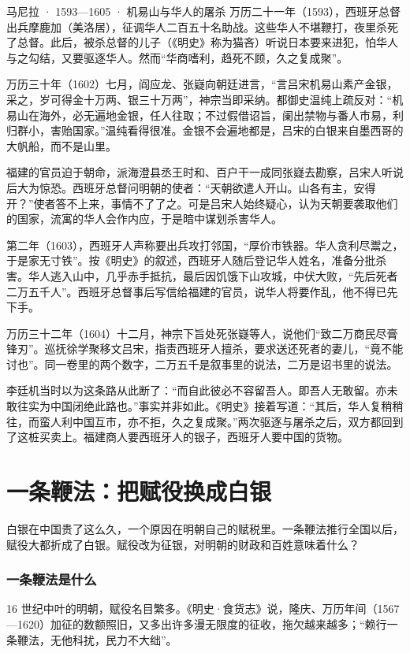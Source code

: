 \begin{case}{马尼拉 · 1593—1605 · 机易山与华人的屠杀}
万历二十一年（1593），西班牙总督出兵摩鹿加（美洛居），征调华人二百五十名助战。这些华人不堪鞭打，夜里杀死了总督\cite{mingshi}。此后，被杀总督的儿子（《明史》称为猫吝）听说日本要来进犯，怕华人与之勾结，又要驱逐华人。然而“华商嗜利，趋死不顾，久之复成聚”\cite{mingshi}。

万历三十年（1602）七月，阎应龙、张嶷向朝廷进言，“言吕宋机易山素产金银，采之，岁可得金十万两、银三十万两”，神宗当即采纳\cite{mingshi}。都御史温纯上疏反对：“机易山在海外，必无遍地金银，任人往取；不过假借诏旨，阑出禁物与番人市易，利归群小，害贻国家。”\cite{mingshi}温纯看得很准。金银不会遍地都是，吕宋的白银来自墨西哥的大帆船，而不是山里。

福建的官员迫于朝命，派海澄县丞王时和、百户干一成同张嶷去勘察，吕宋人听说后大为惊恐。西班牙总督问明朝的使者：“天朝欲遣人开山。山各有主，安得开？”使者答不上来，事情不了了之。可是吕宋人始终疑心，认为天朝要袭取他们的国家，流寓的华人会作内应，于是暗中谋划杀害华人\cite{mingshi}。

第二年（1603），西班牙人声称要出兵攻打邻国，“厚价市铁器。华人贪利尽鬻之，于是家无寸铁”。按《明史》的叙述，西班牙人随后登记华人姓名，准备分批杀害。华人逃入山中，几乎赤手抵抗，最后因饥饿下山攻城，中伏大败，“先后死者二万五千人”。西班牙总督事后写信给福建的官员，说华人将要作乱，他不得已先下手\cite{mingshi}。

万历三十二年（1604）十二月，神宗下旨处死张嶷等人，说他们“致二万商民尽膏锋刃”。巡抚徐学聚移文吕宋，指责西班牙人擅杀，要求送还死者的妻儿，“竟不能讨也”\cite{mingshi}。同一卷里的两个数字，二万五千是叙事里的说法，二万是诏书里的说法。

李廷机当时以为这条路从此断了：“而自此彼必不容留吾人。即吾人无敢留。亦未敢往实为中国闭绝此路也。”\cite{huangmingjingshiwenbian}事实并非如此。《明史》接着写道：“其后，华人复稍稍往，而蛮人利中国互市，亦不拒，久之复成聚。”\cite{mingshi}两次驱逐与屠杀之后，双方都回到了这桩买卖上。福建商人要西班牙人的银子，西班牙人要中国的货物。
\end{case}

\section{一条鞭法：把赋役换成白银}\label{sec:silver-tiaobian}

白银在中国贵了这么久，一个原因在明朝自己的赋税里。一条鞭法推行全国以后，赋役大都折成了白银。赋役改为征银，对明朝的财政和百姓意味着什么？

\subsubsection{一条鞭法是什么}
16 世纪中叶的明朝，赋役名目繁多。《明史·食货志》说，隆庆、万历年间（1567—1620）加征的数额照旧，又多出许多漫无限度的征收，拖欠越来越多；“赖行一条鞭法，无他科扰，民力不大绌”\cite{mingshi}。

